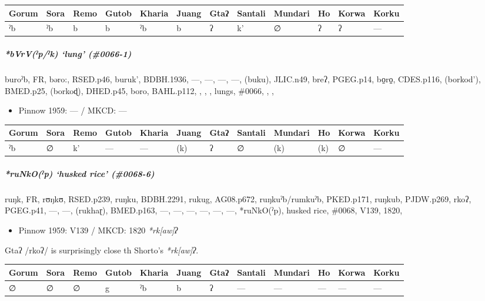 \documentclass[a4paper,]{article}
\providecommand{\tightlist}{%
  \setlength{\itemsep}{0pt}\setlength{\parskip}{0pt}}
\let\oldsubparagraph\subparagraph
\renewcommand{\subparagraph}[1]{\oldsubparagraph{#1}\mbox{}}
\begin{document}
\begin{longtable}[]{@{}llllllllllll@{}}
\toprule
Gorum & Sora & Remo & Gutob & Kharia & Juang & Gtaʔ & Santali & Mundari
& Ho & Korwa & Korku\tabularnewline
\midrule
\endhead
ˀb & ˀb & b & b & ˀb & b & ʔ & k' & ∅ & ʔ & ʔ & ---\tabularnewline
\bottomrule
\end{longtable}

\subparagraph{\texorpdfstring{\emph{*bVrV(ˀp/ˀk)} `lung'
(\#0066-1)}{*bVrV(ˀp/ˀk) lung (\#0066-1)}}\label{bvrvux2c0pux2c0k-lung-0066-1-1}

buroˀb, FR, bəro:, RSED.p46, buruk', BDBH.1936, ---, ---, ---, ---,
(buku), JLIC.n49, breʔ, PGEG.p14, bo̠ro̠, CDES.p116, (borkod'), BMED.p25,
(borkoɖ), DHED.p45, boro, BAHL.p112, , , , lungs, \#0066, , ,

\begin{itemize}
\tightlist
\item
  Pinnow 1959: --- / MKCD: ---
\end{itemize}

\begin{longtable}[]{@{}llllllllllll@{}}
\toprule
Gorum & Sora & Remo & Gutob & Kharia & Juang & Gtaʔ & Santali & Mundari
& Ho & Korwa & Korku\tabularnewline
\midrule
\endhead
ˀb & ∅ & k' & --- & --- & (k) & ʔ & ∅ & (k) & (k) & ∅ &
---\tabularnewline
\bottomrule
\end{longtable}

\subparagraph{\texorpdfstring{\emph{*ruNkO(ˀp)} `husked rice'
(\#0068-6)}{*ruNkO(ˀp) husked rice (\#0068-6)}}\label{runkoux2c0p-husked-rice-0068-6}

ruŋk, FR, rʊŋkʊ, RSED.p239, ruŋku, BDBH.2291, rukug, AG08.p672,
ruŋkuˀb/rumkuˀb, PKED.p171, ruŋkub, PJDW.p269, rkoʔ, PGEG.p41, ---, ---,
(rukhaɽ), BMED.p163, ---, ---, ---, ---, ---, ---, *ruNkO(ˀp), husked
rice, \#0068, V139, 1820,

\begin{itemize}
\tightlist
\item
  Pinnow 1959: V139 / MKCD: 1820 \emph{*rk{[}aw{]}ʔ}
\end{itemize}

Gtaʔ /rkoʔ/ is surprisingly close th Shorto's \emph{*rk{[}aw{]}ʔ}.

\begin{longtable}[]{@{}llllllllllll@{}}
\toprule
Gorum & Sora & Remo & Gutob & Kharia & Juang & Gtaʔ & Santali & Mundari
& Ho & Korwa & Korku\tabularnewline
\midrule
\endhead
∅ & ∅ & ∅ & g & ˀb & b & ʔ & --- & --- & --- & --- & ---\tabularnewline
\bottomrule
\end{longtable}
\end{document}
